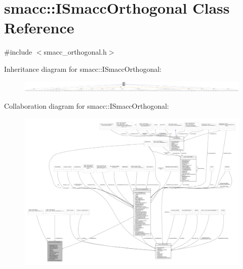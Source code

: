 \hypertarget{classsmacc_1_1ISmaccOrthogonal}{}\section{smacc\+:\+:I\+Smacc\+Orthogonal Class Reference}
\label{classsmacc_1_1ISmaccOrthogonal}


{\ttfamily \#include $<$smacc\+\_\+orthogonal.\+h$>$}



Inheritance diagram for smacc\+:\+:I\+Smacc\+Orthogonal\+:
\nopagebreak
\begin{figure}[H]
\begin{center}
\leavevmode
\includegraphics[width=350pt]{classsmacc_1_1ISmaccOrthogonal__inherit__graph}
\end{center}
\end{figure}


Collaboration diagram for smacc\+:\+:I\+Smacc\+Orthogonal\+:
\nopagebreak
\begin{figure}[H]
\begin{center}
\leavevmode
\includegraphics[width=350pt]{classsmacc_1_1ISmaccOrthogonal__coll__graph}
\end{center}
\end{figure}
